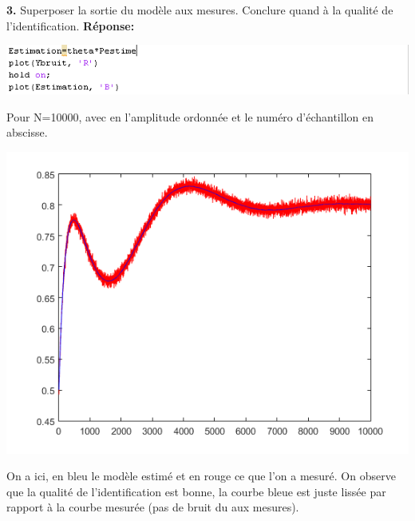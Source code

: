 \documentclass[12pt]{article}
\begin{document}
\medbreak
\textbf{3.} Superposer la sortie du modèle aux mesures. Conclure quand à la qualité de l'identification.
\smallbreak
\textbf{Réponse:}
\begin{flushleft}
\includegraphics{2_3.PNG}
\end{flushleft}
Pour N=10000, avec en l'amplitude ordonnée et le numéro d'échantillon en abscisse.
\begin{flushleft}
\includegraphics{2_3_graph}
\end{flushleft}
On a ici, en bleu le modèle estimé et en rouge ce que l'on a mesuré. On observe que la qualité de l'identification est bonne, la courbe bleue est juste lissée par rapport à la courbe mesurée (pas de bruit du aux mesures). 
\end{document}
